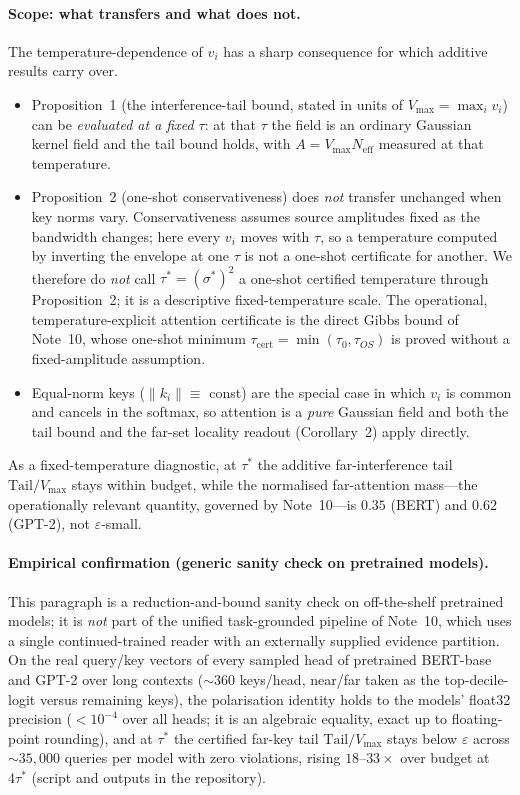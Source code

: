 \documentclass[10pt,twocolumn]{article}
\newcommand{\sstar}{\sigma^{*}}
\newcommand{\Neff}{N_{\mathrm{eff}}}
\begin{document}
\paragraph{Scope: what transfers and what does not.} The temperature-dependence of $v_i$ has a sharp consequence for which additive results carry over.
\begin{itemize}
\item Proposition~1 (the interference-tail bound, stated in units of $V_{\max}=\max_i v_i$) can be \emph{evaluated at a fixed $\tau$}: at that $\tau$ the field is an ordinary Gaussian kernel field and the tail bound holds, with $A=V_{\max}\Neff$ measured at that temperature.
\item Proposition~2 (one-shot conservativeness) does \emph{not} transfer unchanged when key norms vary. Conservativeness assumes source amplitudes fixed as the bandwidth changes; here every $v_i$ moves with $\tau$, so a temperature computed by inverting the envelope at one $\tau$ is not a one-shot certificate for another. We therefore do \emph{not} call $\tau^*=(\sstar)^2$ a one-shot certified temperature through Proposition~2; it is a descriptive fixed-temperature scale. The operational, temperature-explicit attention certificate is the direct Gibbs bound of Note~10, whose one-shot minimum $\tau_{\mathrm{cert}}=\min(\tau_0,\tau_{OS})$ is proved without a fixed-amplitude assumption.
\item Equal-norm keys ($\lVert k_i\rVert\equiv$ const) are the special case in which $v_i$ is common and cancels in the softmax, so attention is a \emph{pure} Gaussian field and both the tail bound and the far-set locality readout (Corollary~2) apply directly.
\end{itemize}
As a fixed-temperature diagnostic, at $\tau^*$ the additive far-interference tail $\mathrm{Tail}/V_{\max}$ stays within budget, while the normalised far-attention mass---the operationally relevant quantity, governed by Note~10---is $0.35$ (BERT) and $0.62$ (GPT-2), not $\varepsilon$-small.
\paragraph{Empirical confirmation (generic sanity check on pretrained models).} This paragraph is a reduction-and-bound sanity check on off-the-shelf pretrained models; it is \emph{not} part of the unified task-grounded pipeline of Note~10, which uses a single continued-trained reader with an externally supplied evidence partition. On the real query/key vectors of every sampled head of pretrained BERT-base and GPT-2 over long contexts ($\sim\!360$ keys/head, near/far taken as the top-decile-logit versus remaining keys), the polarisation identity holds to the models' float32 precision ($<10^{-4}$ over all heads; it is an algebraic equality, exact up to floating-point rounding), and at $\tau^*$ the certified far-key tail $\mathrm{Tail}/V_{\max}$ stays below $\varepsilon$ across $\sim\!35{,}000$ queries per model with zero violations, rising $18$--$33\times$ over budget at $4\tau^*$ (script and outputs in the repository).
\end{document}
